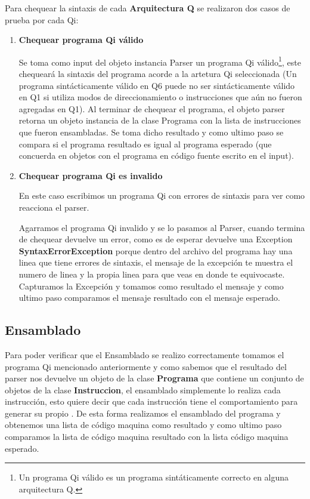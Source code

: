 Para chequear la sintaxis de cada \textbf{Arquitectura Q} se realizaron dos casos de prueba por cada Qi:
\begin{enumerate}
\item \textbf{Chequear programa Qi válido}

Se toma como input del objeto instancia Parser un programa Qi válido\footnote{Un programa Qi válido es un programa sintáticamente correcto en alguna arquitectura Q.}, este chequeará la sintaxis del programa acorde a la artetura Qi seleccionada (Un programa sintácticamente válido en Q6 puede no ser sintácticamente válido en Q1 si utiliza modos de direccionamiento o instrucciones que aún no fueron agregadas en Q1). Al terminar de chequear el programa, el objeto parser retorna un objeto instancia de la clase Programa con la lista de instrucciones que fueron ensambladas. 
Se toma dicho resultado y como ultimo paso se compara si el programa resultado es igual al programa esperado (que concuerda en objetos con el programa en código fuente escrito en el input).


\item \textbf{Chequear programa Qi es invalido} 

En este caso escribimos un programa Qi con errores de sintaxis para ver como reacciona el parser.

Agarramos el programa Qi invalido y se lo pasamos al Parser, cuando termina de chequear devuelve un error, como es de esperar devuelve una Exception \textbf{SyntaxErrorException} porque dentro del archivo del programa hay una linea que tiene errores de sintaxis, el mensaje de la excepción te muestra el numero de linea y la propia linea para que veas en donde te equivocaste. Capturamos la Excepción y tomamos como resultado el mensaje y como ultimo paso comparamos el mensaje resultado con el mensaje esperado.
\end{enumerate}

\subsection{Ensamblado}
Para poder verificar que el Ensamblado se realizo correctamente tomamos el programa Qi mencionado anteriormente y como sabemos que el resultado del parser nos devuelve un objeto de la clase \textbf{Programa} que contiene un conjunto de objetos de la clase \textbf{Instruccion}, el ensamblado simplemente lo realiza cada instrucción, esto quiere decir que cada instrucción tiene el comportamiento para generar su propio \codmaq. De esta forma realizamos el ensamblado del programa y obtenemos una lista de código maquina como resultado y como ultimo paso comparamos la lista de código maquina resultado con la lista código maquina esperado.

